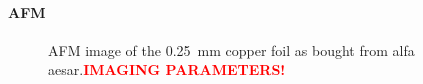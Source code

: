\paragraph{AFM}
\label{sec:foil-AFM}
\begin{figure}[] \centering
	\caption{AFM image of the \SI{0.25}{\mm} copper foil as bought from alfa aesar.\textcolor{red}{\textbf{IMAGING PARAMETERS!}}}
	\label{fig:foil-afm-as-bought}
\end{figure}

